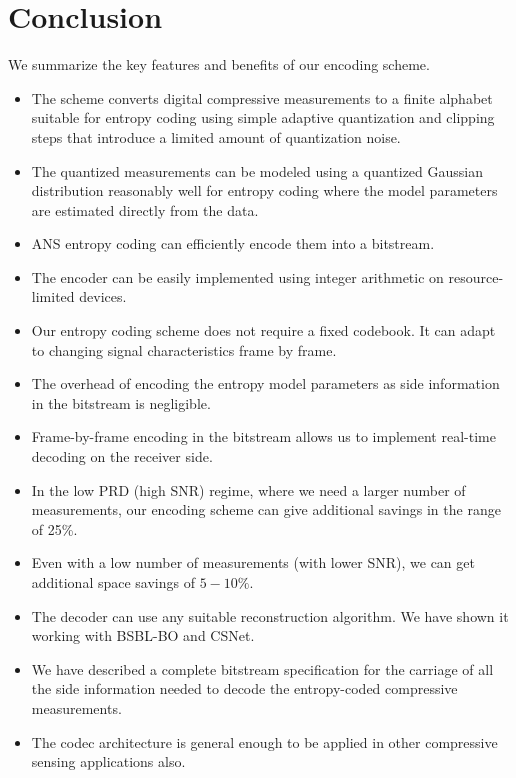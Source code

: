 \section{Conclusion}
\label{sec:conclusion}

We summarize the key features and benefits of our encoding scheme.

\begin{itemize}
    \item The scheme converts digital compressive measurements
    to a finite alphabet suitable for entropy coding using
    simple adaptive quantization and clipping steps that introduce
    a limited amount of quantization noise.
    \item The quantized measurements can be modeled using a quantized
    Gaussian distribution reasonably well for entropy coding where
    the model parameters are estimated directly from the data.
    \item ANS entropy coding can efficiently encode them into a
    bitstream.
    \item The encoder can be easily implemented using integer arithmetic
    on resource-limited devices.
    \item Our entropy coding scheme does not require a fixed codebook.
    It can adapt to changing signal characteristics frame by frame. 
    \item The overhead of encoding the entropy model parameters
    as side information in the bitstream is negligible.
    \item Frame-by-frame encoding in the bitstream 
    allows us to implement real-time decoding on the receiver side.
    \item In the low PRD (high SNR) regime, where we need a larger number
    of measurements, our encoding scheme can
    give additional savings in the range of 25\%.
    \item Even with a low number of measurements (with lower SNR),
    we can get additional space savings of $5-10 \%$.
    \item The decoder can use any suitable reconstruction algorithm.
    We have shown it working with BSBL-BO and CSNet.  
    \item We have described a complete bitstream specification for
    the carriage of all the side information needed to decode the
    entropy-coded compressive measurements.
    \item The codec architecture is general enough to be applied
    in other compressive sensing applications also.
\end{itemize}

